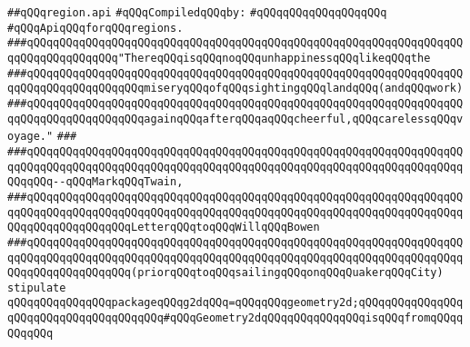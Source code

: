 \label{src/lib/x-kit/draw/region.api}
\verb|##qQQqregion.api|\newline
\newline
\verb|#qQQqCompiledqQQqby:|\newline
\verb|#qQQqqQQqqQQqqQQqqQQq|\newline
\newline
\newline
\newline
\verb|#qQQqApiqQQqforqQQqregions.|\newline
\newline
\newline
\newline
\verb|###qQQqqQQqqQQqqQQqqQQqqQQqqQQqqQQqqQQqqQQqqQQqqQQqqQQqqQQqqQQqqQQqqQQqqQQqqQQqqQQqqQQq"ThereqQQqisqQQqnoqQQqunhappinessqQQqlikeqQQqthe|\newline
\verb|###qQQqqQQqqQQqqQQqqQQqqQQqqQQqqQQqqQQqqQQqqQQqqQQqqQQqqQQqqQQqqQQqqQQqqQQqqQQqqQQqqQQqqQQqmiseryqQQqofqQQqsightingqQQqlandqQQq(andqQQqwork)|\newline
\verb|###qQQqqQQqqQQqqQQqqQQqqQQqqQQqqQQqqQQqqQQqqQQqqQQqqQQqqQQqqQQqqQQqqQQqqQQqqQQqqQQqqQQqqQQqagainqQQqafterqQQqaqQQqcheerful,qQQqcarelessqQQqvoyage."|\newline
\verb|###|\newline
\verb|###qQQqqQQqqQQqqQQqqQQqqQQqqQQqqQQqqQQqqQQqqQQqqQQqqQQqqQQqqQQqqQQqqQQqqQQqqQQqqQQqqQQqqQQqqQQqqQQqqQQqqQQqqQQqqQQqqQQqqQQqqQQqqQQqqQQqqQQqqQQqqQQq--qQQqMarkqQQqTwain,|\newline
\verb|###qQQqqQQqqQQqqQQqqQQqqQQqqQQqqQQqqQQqqQQqqQQqqQQqqQQqqQQqqQQqqQQqqQQqqQQqqQQqqQQqqQQqqQQqqQQqqQQqqQQqqQQqqQQqqQQqqQQqqQQqqQQqqQQqqQQqqQQqqQQqqQQqqQQqqQQqqQQqLetterqQQqtoqQQqWillqQQqBowen|\newline
\verb|###qQQqqQQqqQQqqQQqqQQqqQQqqQQqqQQqqQQqqQQqqQQqqQQqqQQqqQQqqQQqqQQqqQQqqQQqqQQqqQQqqQQqqQQqqQQqqQQqqQQqqQQqqQQqqQQqqQQqqQQqqQQqqQQqqQQqqQQqqQQqqQQqqQQqqQQqqQQq(priorqQQqtoqQQqsailingqQQqonqQQqQuakerqQQqCity)|\newline
\newline
\newline
\newline
\verb|stipulate|\newline
\verb|qQQqqQQqqQQqqQQqpackageqQQqg2dqQQq=qQQqqQQqgeometry2d;qQQqqQQqqQQqqQQqqQQqqQQqqQQqqQQqqQQqqQQq#qQQqGeometry2dqQQqqQQqqQQqqQQqisqQQqfromqQQqqQQqqQQq|\newline
